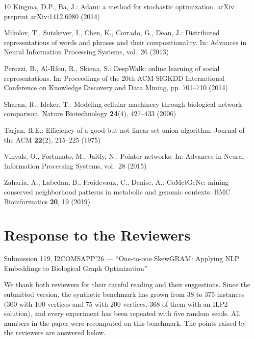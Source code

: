\documentclass{llncs}
\begin{document}
\begin{thebibliography}{10}
Kingma, D.P., Ba, J.: Adam: a method for stochastic optimization. arXiv preprint arXiv:1412.6980 (2014)

Mikolov, T., Sutskever, I., Chen, K., Corrado, G., Dean, J.: Distributed representations of words and phrases and their compositionality. In: Advances in Neural Information Processing Systems, vol.~26 (2013)

Perozzi, B., Al-Rfou, R., Skiena, S.: DeepWalk: online learning of social representations. In: Proceedings of the 20th ACM SIGKDD International Conference on Knowledge Discovery and Data Mining, pp. 701--710 (2014)

Sharan, R., Ideker, T.: Modeling cellular machinery through biological network comparison. Nature Biotechnology \textbf{24}(4), 427--433 (2006)

Tarjan, R.E.: Efficiency of a good but not linear set union algorithm. Journal of the ACM \textbf{22}(2), 215--225 (1975)

Vinyals, O., Fortunato, M., Jaitly, N.: Pointer networks. In: Advances in Neural Information Processing Systems, vol.~28 (2015)

Zaharia, A., Labedan, B., Froidevaux, C., Denise, A.: CoMetGeNe: mining conserved neighborhood patterns in metabolic and genomic contexts. BMC Bioinformatics \textbf{20}, 19 (2019)

\end{thebibliography}

\clearpage
\section*{Response to the Reviewers}
\noindent Submission 119, I2COMSAPP'26 --- ``One-to-one SkewGRAM: Applying NLP Embeddings to Biological Graph Optimization''
\medskip

We thank both reviewers for their careful reading and their suggestions. Since the submitted version, the synthetic benchmark has grown from 38 to 375 instances (300 with 100 vertices and 75 with 200 vertices, 368 of them with an ILP2 solution), and every experiment has been repeated with five random seeds. All numbers in the paper were recomputed on this benchmark. The points raised by the reviewers are answered below.
\end{document}

